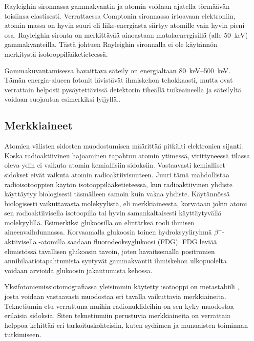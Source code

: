 Rayleighin sironnassa gammakvantin ja atomin voidaan ajatella törmäävän toisiinsa elastisesti. Verrattaessa Comptonin sironnassa irtoavaan elektroniin, atomin massa on hyvin suuri eli liike-energiasta siirtyy atomille vain hyvin pieni osa. Rayleighin sironta on merkittävää ainoastaan matalaenergisillä (alle \qty{50}{\kilo\electronvolt}) gammakvanteilla. Tästä johtuen Rayleighin sironnalla ei ole käytännön merkitystä isotooppilääketieteessä.\cite{cherry_interaction_2012}

Gammakuvantamisessa havaittava säteily on energialtaan \qtyrange{80}{500}{\kilo\electronvolt}. Tämän energia-alueen fotonit lävistävät ihmiskehon tehokkaasti, mutta ovat verrattain helposti pysäytettävissä detektorin tiheällä tuikeaineella ja säteilyltä voidaan suojautua esimerkiksi lyijyllä.\cite{cherry_gamma_2012}.

\subsection{Merkkiaineet}
Atomien välisten sidosten muodostumisen määrittää pitkälti elektronien sijanti. Koska radioaktiivinen hajoaminen tapahtuu atomin ytimessä, virittyneessä tilassa oleva ydin ei vaikuta atomin kemiallisiin sidoksiin. Vastaavasti kemialliset sidokset eivät vaikuta atomin radioaktiivisuuteen.\cite{cherry_modes_2012} Juuri tämä mahdollistaa radioisotooppien käytön isotooppilääketieteessä, kun radioaktiivinen yhdiste käyttäytyy biologisesti täsmälleen samoin kuin vakaa yhdiste. Käytännössä biologisesti vaikuttavasta molekyylistä, eli merkkiaineesta, korvataan jokin atomi sen radioaktiivisella isotoopilla tai hyvin samankaltaisesti käyttäytyvällä molekyylillä\cite{cherry_modes_2012, crisan_radiopharmaceuticals_2022}. Esimerkiksi glukoosilla on elintärkeä rooli ihmisen aineenvaihdunnassa. Korvaamalla glukoosin toinen hydroksyyliryhmä $\beta^{+}$-aktiivisella -atomilla saadaan fluorodeoksyglukoosi (FDG). FDG leviää elimistössä tavallisen glukoosin tavoin, joten havaitsemalla positronien annihilaatiotapahtumista syntyvät gammakvantit ihmiskehon ulkopuolelta voidaan arvioida glukoosin jakautumista kehossa.\cite{crisan_radiopharmaceuticals_2022}

Yksifotoniemissiotomografiassa yleisimmin käytetty isotooppi on metastabiili , josta voidaan vastaavasti muodostaa eri tavalla vaikuttavia merkkiaineita. Teknetiumin etu verrattuna muihin radionuklideihin on sen kyky muodostaa erilaisia sidoksia. Siten teknetiumiin perustuvia merkkiaineita on verrattain helppoa kehittää eri tarkoituskohteisiin, kuten sydämen ja munuaisten toiminnan tutkimiseen.\cite{crisan_radiopharmaceuticals_2022}

